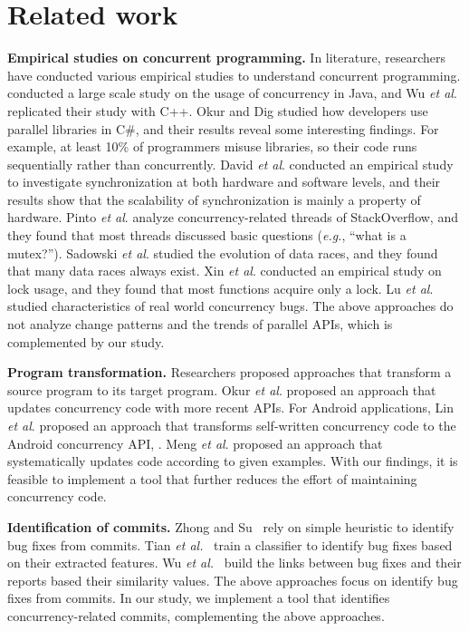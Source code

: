 \section{Related work}
\noindent
\textbf{Empirical studies on concurrent programming.} In literature, researchers have conducted various empirical studies to understand concurrent programming. \cite{journals/jss/PintoTFFB15} conducted a large scale study on the usage of concurrency in Java, and Wu \textit{et al}. \cite{journals/infsof/WuCZX16} replicated their study with C++. Okur and Dig \cite{conf/sigsoft/OkurD12} studied how developers use parallel libraries in C\#, and their results reveal some interesting findings. For example, at least 10\% of programmers misuse libraries, so their code runs sequentially rather than concurrently. David \textit{et al}. \cite{conf/sosp/DavidGT13} conducted an empirical study to investigate synchronization at both hardware and software levels, and their results show that the scalability of synchronization is mainly a property of hardware. Pinto \textit{et al}. \cite{conf/oopsla/PintoTC15} analyze concurrency-related threads of StackOverflow, and they found that most threads discussed basic questions (\emph{e.g.}, ``what is a mutex?''). Sadowski \textit{et al}. \cite{conf/msr/SadowskiYK12} studied the evolution of data races, and they found that many data races always exist. Xin \textit{et al}. \cite{conf/icsm/XinQHXZWG13} conducted an empirical study on lock usage, and they found that most functions acquire only a lock. Lu \textit{et al}. \cite{conf/asplos/LuPSZ08} studied characteristics of real world concurrency bugs. The above approaches do not analyze change patterns and the trends of parallel APIs, which is complemented by our study.

\noindent
\textbf{Program transformation.} Researchers proposed approaches that transform a source program to its target program. Okur \textit{et al}. \cite{conf/ecoop/OkurED14} proposed an approach that updates concurrency code with more recent APIs. For Android applications, Lin \textit{et al}. \cite{conf/sigsoft/LinRD14} proposed an approach that transforms self-written concurrency code to the Android concurrency API, . Meng \textit{et al}. \cite{conf/pldi/MengKM11} proposed an approach that systematically updates code according to given examples. With our findings, it is feasible to implement a tool that further reduces the effort of maintaining concurrency code.

\noindent
\textbf{Identification of commits.} Zhong and Su~\cite{zhong2015bugfix} rely on simple heuristic to identify bug fixes from commits. Tian \emph{et al.}~\cite{tian2012identifying} train a classifier to identify bug fixes based on their extracted features. Wu \emph{et al.}~\cite{wu2011relink} build the links between bug fixes and their reports based their similarity values. The above approaches focus on identify bug fixes from commits. In our study, we implement a tool that identifies concurrency-related commits, complementing the above approaches. 
